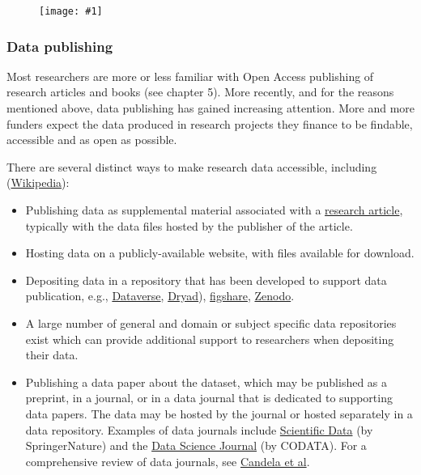 \documentclass{article}
\newlength{\imgwidth}
\newcommand\scaledgraphics[2]{%
                
\settowidth{\imgwidth}{\texttt{[image: \#1]}}%
                
\setlength{\imgwidth}{\minof{\imgwidth}{#2\textwidth}}%
                
\texttt{[image: \#1]}%
                
}
\begin{document}
\begin{figure}
\scaledgraphics{aae2bfa0-3eee-47db-87e2-366fa48e93cb.png}{1}
\label{F50261431}
\end{figure}


\subsubsection{\textbf{Data publishing}}\label{data-publishing}



Most researchers are more or less familiar with Open Access publishing of research articles and books (see chapter 5). More recently, and for the reasons mentioned above, data publishing has gained increasing attention. More and more funders expect the data produced in research projects they finance to be findable, accessible and as open as possible.


There are several distinct ways to make research data accessible, including (\href{https://en.wikipedia.org/wiki/Data_publishing}{Wikipedia}):

\begin{itemize}
\item Publishing data as supplemental material associated with a \href{https://en.wikipedia.org/wiki/Research_article}{research article}, typically with the data files hosted by the publisher of the article.


\item Hosting data on a publicly-available website, with files available for download.


\item Depositing data in a repository that has been developed to support data publication, e.g., \href{https://en.wikipedia.org/wiki/Dataverse}{Dataverse}, \href{https://en.wikipedia.org/wiki/Dryad_(repository}{Dryad}), \href{https://en.wikipedia.org/wiki/Figshare}{figshare}, \href{https://en.wikipedia.org/wiki/Zenodo}{Zenodo}.


\item A large number of general and domain or subject specific data repositories exist which can provide additional support to researchers when depositing their data.


\item Publishing a data paper about the dataset, which may be published as a preprint, in a journal, or in a data journal that is dedicated to supporting data papers. The data may be hosted by the journal or hosted separately in a data repository. Examples of data journals include \href{https://www.nature.com/sdata/}{Scientific Data} (by SpringerNature) and the \href{http://www.codata.org/publications/data-science-journal}{Data Science Journal} (by CODATA). For a comprehensive review of data journals, see \href{https://doi.org/10.1002%2Fasi.23358}{Candela et al}.


\end{itemize}
\end{document}
